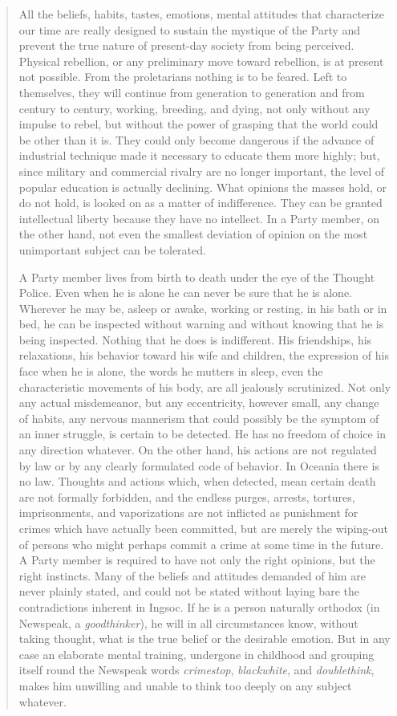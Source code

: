 \begin{quotation}
All the beliefs, habits, tastes, emotions, mental attitudes that
characterize our time are really designed to sustain the mystique of the
Party and prevent the true nature of present-day society from being
perceived. Physical rebellion, or any preliminary move toward rebellion,
is at present not possible. From the proletarians nothing is to be
feared. Left to themselves, they will continue from generation to
generation and from century to century, working, breeding, and dying,
not only without any impulse to rebel, but without the power of grasping
that the world could be other than it is. They could only become
dangerous if the advance of industrial technique made it necessary to
educate them more highly; but, since military and commercial rivalry are
no longer important, the level of popular education is actually
declining. What opinions the masses hold, or do not hold, is looked on
as a matter of indifference. They can be granted intellectual liberty
because they have no intellect. In a Party member, on the other hand,
not even the smallest deviation of opinion on the most unimportant
subject can be tolerated.

A Party member lives from birth to death under the eye of the Thought
Police. Even when he is alone he can never be sure that he is alone.
Wherever he may be, asleep or awake, working or resting, in his bath or
in bed, he can be inspected without warning and without knowing that he
is being inspected. Nothing that he does is indifferent. His
friendships, his relaxations, his behavior toward his wife and children,
the expression of his face when he is alone, the words he mutters in
sleep, even the characteristic movements of his body, are all jealously
scrutinized. Not only any actual misdemeanor, but any eccentricity,
however small, any change of habits, any nervous mannerism that could
possibly be the symptom of an inner struggle, is certain to be detected.
He has no freedom of choice in any direction whatever. On the other
hand, his actions are not regulated by law or by any clearly formulated
code of behavior. In Oceania there is no law. Thoughts and actions
which, when detected, mean certain death are not formally forbidden, and
the endless purges, arrests, tortures, imprisonments, and vaporizations
are not inflicted as punishment for crimes which have actually been
committed, but are merely the wiping-out of persons who might perhaps
commit a crime at some time in the future. A Party member is required to
have not only the right opinions, but the right instincts. Many of the
beliefs and attitudes demanded of him are never plainly stated, and
could not be stated without laying bare the contradictions inherent in
Ingsoc. If he is a person naturally orthodox (in Newspeak, a
\emph{goodthinker}), he will in all circumstances know, without taking
thought, what is the true belief or the desirable emotion. But in any
case an elaborate mental training, undergone in childhood and grouping
itself round the Newspeak words \emph{crimestop}, \emph{blackwhite}, and
\emph{doublethink}, makes him unwilling and unable to think too deeply
on any subject whatever.


\end{quotation}
